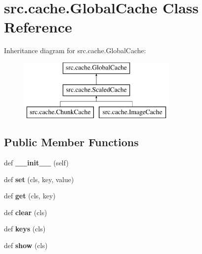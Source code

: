 \hypertarget{classsrc_1_1cache_1_1_global_cache}{}\section{src.\+cache.\+Global\+Cache Class Reference}
\label{classsrc_1_1cache_1_1_global_cache}
Inheritance diagram for src.\+cache.\+Global\+Cache\+:\begin{figure}[H]
\begin{center}
\leavevmode
\includegraphics[height=3.000000cm]{classsrc_1_1cache_1_1_global_cache}
\end{center}
\end{figure}
\subsection*{Public Member Functions}
\begin{DoxyCompactItemize}
\item 
\hypertarget{classsrc_1_1cache_1_1_global_cache_aa95fa30f33a7cb2e0a6c7935b90e706c}{}\label{classsrc_1_1cache_1_1_global_cache_aa95fa30f33a7cb2e0a6c7935b90e706c} 
def {\bfseries \+\_\+\+\_\+init\+\_\+\+\_\+} (self)
\item 
\hypertarget{classsrc_1_1cache_1_1_global_cache_a8a2bbb4469040976a555f3c373b7322a}{}\label{classsrc_1_1cache_1_1_global_cache_a8a2bbb4469040976a555f3c373b7322a} 
def {\bfseries set} (cls, key, value)
\item 
\hypertarget{classsrc_1_1cache_1_1_global_cache_a5a8544f65eee5d496052c2f4eb30cba5}{}\label{classsrc_1_1cache_1_1_global_cache_a5a8544f65eee5d496052c2f4eb30cba5} 
def {\bfseries get} (cls, key)
\item 
\hypertarget{classsrc_1_1cache_1_1_global_cache_a093c5f07b870abef862e1e76bf861abc}{}\label{classsrc_1_1cache_1_1_global_cache_a093c5f07b870abef862e1e76bf861abc} 
def {\bfseries clear} (cls)
\item 
\hypertarget{classsrc_1_1cache_1_1_global_cache_abeaa23d23d60a6e91815b8298b064ec2}{}\label{classsrc_1_1cache_1_1_global_cache_abeaa23d23d60a6e91815b8298b064ec2} 
def {\bfseries keys} (cls)
\item 
\hypertarget{classsrc_1_1cache_1_1_global_cache_a62b2e681ac8bbd62f5fd11306ed5f96e}{}\label{classsrc_1_1cache_1_1_global_cache_a62b2e681ac8bbd62f5fd11306ed5f96e} 
def {\bfseries show} (cls)
\end{DoxyCompactItemize}
